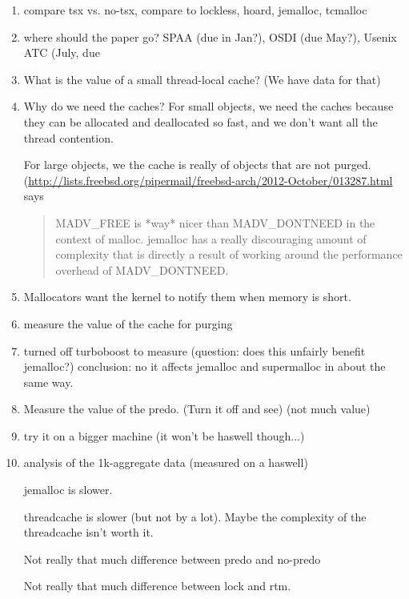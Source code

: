 \begin{enumerate}
 \item compare tsx vs. no-tsx, compare to lockless, hoard, jemalloc, tcmalloc

 \item where should the paper go?  SPAA (due in Jan?), OSDI (due May?), Usenix ATC (July, due

 \item What is the value of a small thread-local cache? (We have data for that)

 \item Why do we need the caches?
  For small objects, we need the caches because they can be allocated and deallocated so fast, and we don't want all the thread contention.

  For large objects, we the cache is really of objects that are not purged.  (\url{http://lists.freebsd.org/pipermail/freebsd-arch/2012-October/013287.html} says 
\begin{quote}
MADV\_FREE is *way* nicer than MADV\_DONTNEED in the context of malloc.  jemalloc has a really discouraging amount of complexity that is directly a result of working around the performance overhead of MADV\_DONTNEED.
\end{quote}
 
 \item Mallocators want the kernel to notify them when memory is short.

 \item measure the value of the cache for purging

 \item turned off turboboost to measure (question: does this unfairly benefit jemalloc?)
   conclusion: no it affects jemalloc and supermalloc in about the same way.

\item Measure the value of the predo.  (Turn it off and see) (not much value)

\item try it on a bigger machine (it won't be haswell though...)

\item analysis of the 1k-aggregate data (measured on a haswell)

 jemalloc is slower.

 threadcache is slower (but not by a lot).  Maybe the complexity of the threadcache isn't worth it.

 Not really that much difference between predo and no-predo

 Not really that much difference between lock and rtm.


\end{enumerate}
